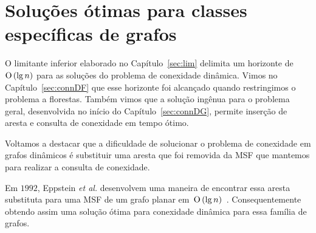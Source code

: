 \section{Soluções ótimas para classes específicas de grafos}

O limitante inferior elaborado no Capítulo~\ref{sec:lim} delimita um horizonte de~$\text{O}\left(\lg n\right)$ para as soluções do problema de conexidade dinâmica. Vimos no Capítulo~\ref{sec:connDF} que esse horizonte foi alcançado quando restringimos o problema a florestas. Também vimos que a solução ingênua para o problema geral, desenvolvida no início do Capítulo~\ref{sec:connDG}, permite inserção de aresta e consulta de conexidade em tempo ótimo.

Voltamos a destacar que a dificuldade de solucionar o problema de conexidade em grafos dinâmicos é substituir uma aresta que foi removida da MSF que mantemos para realizar a consulta de conexidade.

Em $1992$, Eppstein \textit{et al.} desenvolvem uma maneira de encontrar essa aresta substituta para uma MSF de um grafo planar em~$\text{O}\left(\lg n\right)$~\cite{EPPSTEIN-planar}. Consequentemente obtendo assim uma solução ótima para conexidade dinâmica para essa família de grafos.


